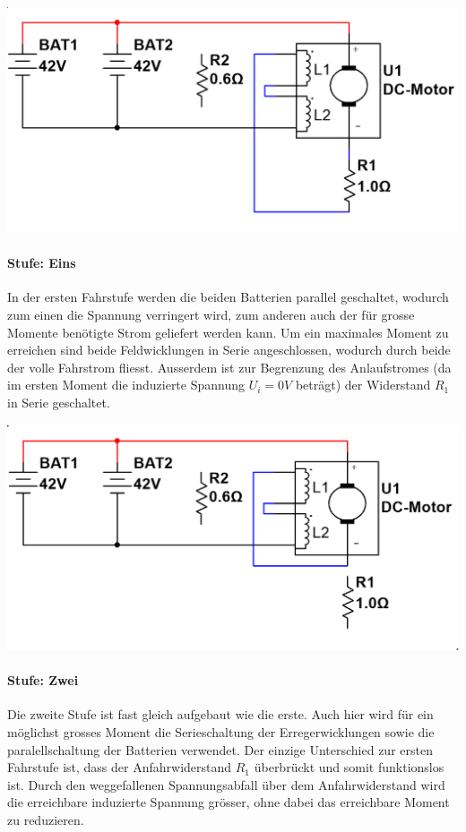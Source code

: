 \begin{minipage}{0.49\textwidth}
	\includegraphics[width=\columnwidth]{images/Stufenschalter/Stufe_1.png}%
\end{minipage}
\begin{minipage}{0.5\textwidth}
	\paragraph{Stufe: Eins}
	In der ersten Fahrstufe werden die beiden Batterien parallel geschaltet, wodurch zum einen die Spannung verringert wird, zum anderen auch der für grosse Momente benötigte Strom geliefert werden kann. Um ein maximales Moment zu erreichen sind beide Feldwicklungen in Serie angeschlossen, wodurch durch beide der volle Fahrstrom fliesst. Ausserdem ist zur Begrenzung des Anlaufstromes (da im ersten Moment die induzierte Spannung $U_i=0V$ beträgt) der Widerstand $R_1$ in Serie geschaltet.
\end{minipage}

\begin{minipage}{0.49\textwidth}
	\includegraphics[width=\columnwidth]{images/Stufenschalter/Stufe_2.png}%
\end{minipage}
\begin{minipage}{0.5\textwidth}
	\paragraph{Stufe: Zwei}
	Die zweite Stufe ist fast gleich aufgebaut wie die erste. Auch hier wird für ein möglichst grosses Moment die Serieschaltung der Erregerwicklungen sowie die paralellschaltung der Batterien verwendet. Der einzige Unterschied zur ersten Fahrstufe ist, dass der Anfahrwiderstand $R_1$ überbrückt und somit funktionslos ist. Durch den weggefallenen Spannungsabfall über dem Anfahrwiderstand wird die erreichbare induzierte Spannung grösser, ohne dabei das erreichbare Moment zu reduzieren.
\end{minipage}


